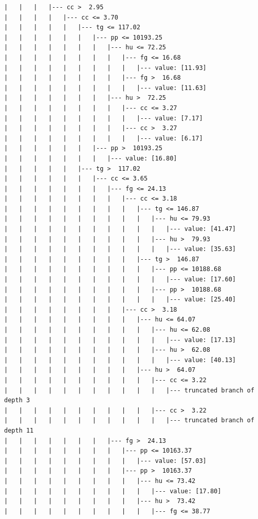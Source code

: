 \documentclass[UTF8, a4paper]{ctexart}
\begin{document}
\begin{lstlisting}
|   |   |   |--- cc >  2.95
|   |   |   |   |--- cc <= 3.70
|   |   |   |   |   |--- tg <= 117.02
|   |   |   |   |   |   |--- pp <= 10193.25
|   |   |   |   |   |   |   |--- hu <= 72.25
|   |   |   |   |   |   |   |   |--- fg <= 16.68
|   |   |   |   |   |   |   |   |   |--- value: [11.93]
|   |   |   |   |   |   |   |   |--- fg >  16.68
|   |   |   |   |   |   |   |   |   |--- value: [11.63]
|   |   |   |   |   |   |   |--- hu >  72.25
|   |   |   |   |   |   |   |   |--- cc <= 3.27
|   |   |   |   |   |   |   |   |   |--- value: [7.17]
|   |   |   |   |   |   |   |   |--- cc >  3.27
|   |   |   |   |   |   |   |   |   |--- value: [6.17]
|   |   |   |   |   |   |--- pp >  10193.25
|   |   |   |   |   |   |   |--- value: [16.80]
|   |   |   |   |   |--- tg >  117.02
|   |   |   |   |   |   |--- cc <= 3.65
|   |   |   |   |   |   |   |--- fg <= 24.13
|   |   |   |   |   |   |   |   |--- cc <= 3.18
|   |   |   |   |   |   |   |   |   |--- tg <= 146.87
|   |   |   |   |   |   |   |   |   |   |--- hu <= 79.93
|   |   |   |   |   |   |   |   |   |   |   |--- value: [41.47]
|   |   |   |   |   |   |   |   |   |   |--- hu >  79.93
|   |   |   |   |   |   |   |   |   |   |   |--- value: [35.63]
|   |   |   |   |   |   |   |   |   |--- tg >  146.87
|   |   |   |   |   |   |   |   |   |   |--- pp <= 10188.68
|   |   |   |   |   |   |   |   |   |   |   |--- value: [17.60]
|   |   |   |   |   |   |   |   |   |   |--- pp >  10188.68
|   |   |   |   |   |   |   |   |   |   |   |--- value: [25.40]
|   |   |   |   |   |   |   |   |--- cc >  3.18
|   |   |   |   |   |   |   |   |   |--- hu <= 64.07
|   |   |   |   |   |   |   |   |   |   |--- hu <= 62.08
|   |   |   |   |   |   |   |   |   |   |   |--- value: [17.13]
|   |   |   |   |   |   |   |   |   |   |--- hu >  62.08
|   |   |   |   |   |   |   |   |   |   |   |--- value: [40.13]
|   |   |   |   |   |   |   |   |   |--- hu >  64.07
|   |   |   |   |   |   |   |   |   |   |--- cc <= 3.22
|   |   |   |   |   |   |   |   |   |   |   |--- truncated branch of depth 3
|   |   |   |   |   |   |   |   |   |   |--- cc >  3.22
|   |   |   |   |   |   |   |   |   |   |   |--- truncated branch of depth 11
|   |   |   |   |   |   |   |--- fg >  24.13
|   |   |   |   |   |   |   |   |--- pp <= 10163.37
|   |   |   |   |   |   |   |   |   |--- value: [57.03]
|   |   |   |   |   |   |   |   |--- pp >  10163.37
|   |   |   |   |   |   |   |   |   |--- hu <= 73.42
|   |   |   |   |   |   |   |   |   |   |--- value: [17.80]
|   |   |   |   |   |   |   |   |   |--- hu >  73.42
|   |   |   |   |   |   |   |   |   |   |--- fg <= 38.77

\end{lstlisting}
\end{document}
